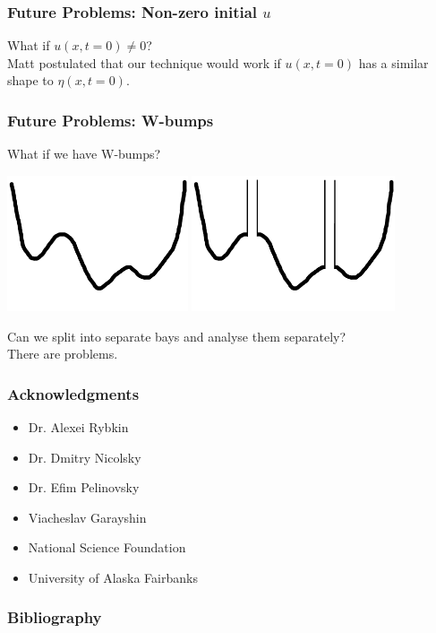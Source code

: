 \documentclass[xcolor=dvipsnames]{beamer}
\begin{document}
\begin{frame}
\frametitle{Future Problems: Non-zero initial $u$}
What if $u(x,t=0) \neq 0$?\\
Matt postulated that our technique would work if $u(x,t=0)$ has a similar shape to $\eta(x,t=0)$.
\end{frame}

\begin{frame}
\frametitle{Future Problems: W-bumps}
What if we have W-bumps?
\begin{center}
\includegraphics[width = 0.4\textwidth]{wbumps1.png}
\quad
\includegraphics[width = 0.45\textwidth]{wbumps2.png}
\end{center}
Can we split into separate bays and analyse them separately?\\
There are problems.
\end{frame}


\begin{frame}
\frametitle{Acknowledgments}

\begin{itemize}
\item Dr. Alexei Rybkin  
\item Dr. Dmitry Nicolsky
\item Dr. Efim Pelinovsky
\item Viacheslav Garayshin
\item National Science Foundation
\item University of Alaska Fairbanks
\end{itemize}
\end{frame}

\begin{frame}[allowframebreaks]
\nocite{*}
\frametitle{Bibliography}


\end{frame}
\end{document}
